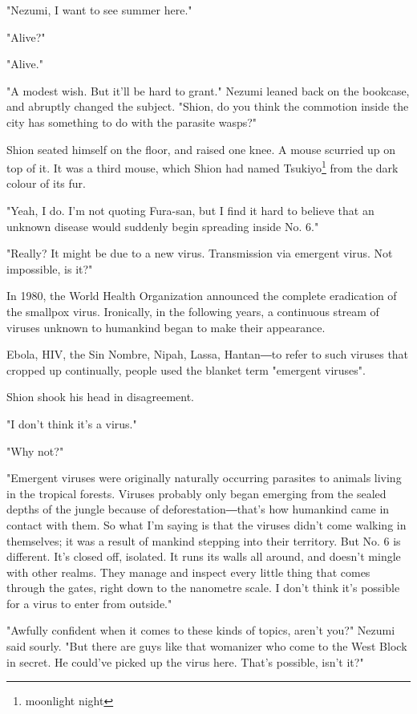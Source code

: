 "Nezumi, I want to see summer here."

"Alive?"

"Alive."

"A modest wish. But it'll be hard to grant." Nezumi leaned back on the
bookcase, and abruptly changed the subject. "Shion, do you think the
commotion inside the city has something to do with the parasite wasps?"

Shion seated himself on the floor, and raised one knee. A mouse scurried
up on top of it. It was a third mouse, which Shion had named Tsukiyo\footnote{moonlight night}
from the dark colour of its fur.

"Yeah, I do. I'm not quoting Fura-san, but I find it hard to believe
that an unknown disease would suddenly begin spreading inside No. 6."

"Really? It might be due to a new virus. Transmission via emergent
virus. Not impossible, is it?"

In 1980, the World Health Organization announced the complete
eradication of the smallpox virus. Ironically, in the following years, a
continuous stream of viruses unknown to humankind began to make their
appearance.

Ebola, HIV, the Sin Nombre, Nipah, Lassa, Hantan―to refer to such
viruses that cropped up continually, people used the blanket term
"emergent viruses".

Shion shook his head in disagreement.

"I don't think it's a virus."

"Why not?"

"Emergent viruses were originally naturally occurring parasites to
animals living in the tropical forests. Viruses probably only began
emerging from the sealed depths of the jungle because of
deforestation―that's how humankind came in contact with them. So what
I'm saying is that the viruses didn't come walking in themselves; it was
a result of mankind stepping into their territory. But No. 6 is
different. It's closed off, isolated. It runs its walls all around, and
doesn't mingle with other realms. They manage and inspect every little
thing that comes through the gates, right down to the nanometre scale. I
don't think it's possible for a virus to enter from outside."

"Awfully confident when it comes to these kinds of topics, aren't you?"
Nezumi said sourly. "But there are guys like that womanizer who come to
the West Block in secret. He could've picked up the virus here. That's
possible, isn't it?"

